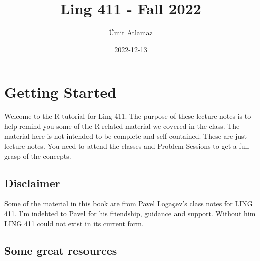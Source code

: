 \documentclass[
]{book}
\title{Ling 411 - Fall 2022}
\author{Ümit Atlamaz}
\date{2022-12-13}
\newenvironment{Shaded}{\begin{snugshade}}{\end{snugshade}}
\newcommand{\AttributeTok}[1]{\textcolor[rgb]{0.77,0.63,0.00}{#1}}
\newcommand{\CommentTok}[1]{\textcolor[rgb]{0.56,0.35,0.01}{\textit{#1}}}
\newcommand{\DecValTok}[1]{\textcolor[rgb]{0.00,0.00,0.81}{#1}}
\newcommand{\FunctionTok}[1]{\textcolor[rgb]{0.00,0.00,0.00}{#1}}
\newcommand{\NormalTok}[1]{#1}
\newcommand{\SpecialCharTok}[1]{\textcolor[rgb]{0.00,0.00,0.00}{#1}}
\newcommand{\StringTok}[1]{\textcolor[rgb]{0.31,0.60,0.02}{#1}}
\begin{document}
\maketitle

{
\setcounter{tocdepth}{1}
\tableofcontents
}
\begin{Shaded}
\end{Shaded}

\hypertarget{getting-started}{%
\chapter{Getting Started}\label{getting-started}}

Welcome to the R tutorial for Ling 411. The purpose of these lecture notes is to help remind you some of the R related material we covered in the class. The material here is not intended to be complete and self-contained. These are just lecture notes. You need to attend the classes and Problem Sessions to get a full grasp of the concepts.

\hypertarget{disclaimer}{%
\section{Disclaimer}\label{disclaimer}}

Some of the material in this book are from \href{https://scholar.google.com/citations?user=fhbdTJIAAAAJ\&hl=tr}{Pavel Logaçev}'s class notes for LING 411. I'm indebted to Pavel for his friendship, guidance and support. Without him LING 411 could not exist in its current form.

\hypertarget{some-great-resources}{%
\section{Some great resources}\label{some-great-resources}}
\end{document}
